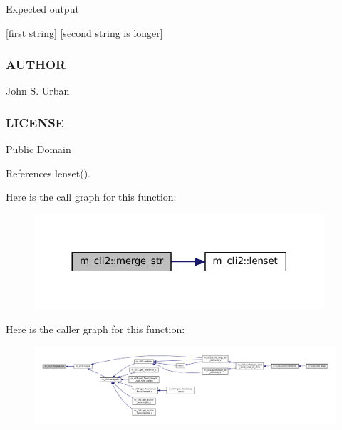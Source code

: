 Expected output

\mbox{[}first string\mbox{]} \mbox{[}second string is longer\mbox{]} \subsubsection*{A\+U\+T\+H\+OR}

John S. Urban \subsubsection*{L\+I\+C\+E\+N\+SE}

Public Domain 

References lenset().

Here is the call graph for this function\+:\nopagebreak
\begin{figure}[H]
\begin{center}
\leavevmode
\includegraphics[width=305pt]{namespacem__cli2_a8e172feb2e4ae4d21d4fceb4e54f593c_cgraph}
\end{center}
\end{figure}
Here is the caller graph for this function\+:\nopagebreak
\begin{figure}[H]
\begin{center}
\leavevmode
\includegraphics[width=350pt]{namespacem__cli2_a8e172feb2e4ae4d21d4fceb4e54f593c_icgraph}
\end{center}
\end{figure}
\mbox{\label{namespacem__cli2_a368e9aaa556f69228e7f0837bd558b82}} 
